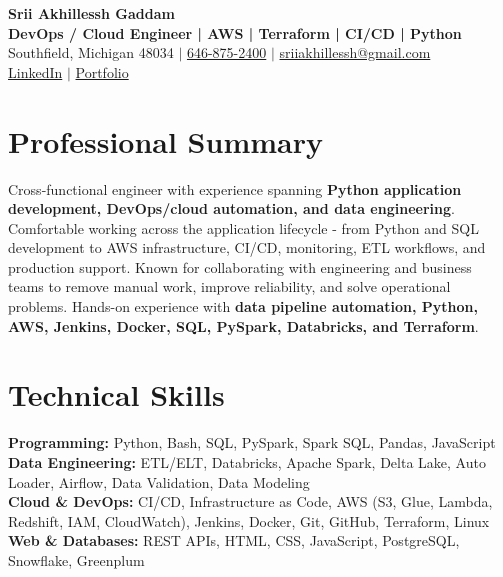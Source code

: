 \documentclass[letterpaper,10pt]{article}
\begin{document}
\fontsize{9.35pt}{10.45pt}\selectfont

\begin{center}
    {\LARGE \textbf{Srii Akhillessh Gaddam}} \\[-1pt]
    \textbf{DevOps / Cloud Engineer | AWS | Terraform | CI/CD | Python} \\[2pt]
    Southfield, Michigan 48034 $|$
    \href{tel:6468752400}{646-875-2400} $|$
    \href{mailto:sriiakhillessh@gmail.com}{sriiakhillessh@gmail.com} \\[1pt]
    \href{https://www.linkedin.com/in/srii-akhiilessh-gaddam-b48668191/}{LinkedIn} $|$
    \href{https://sriiakhillesshg.github.io/portfolio/}{Portfolio}
\end{center}
\vspace{-8pt}

\section{Professional Summary}
\small{Cross-functional engineer with experience spanning \textbf{Python application development, DevOps/cloud automation, and data engineering}. Comfortable working across the application lifecycle - from Python and SQL development to AWS infrastructure, CI/CD, monitoring, ETL workflows, and production support. Known for collaborating with engineering and business teams to remove manual work, improve reliability, and solve operational problems. Hands-on experience with \textbf{data pipeline automation, Python, AWS, Jenkins, Docker, SQL, PySpark, Databricks, and Terraform}.}

\section{Technical Skills}
\small{
\textbf{Programming:} Python, Bash, SQL, PySpark, Spark SQL, Pandas, JavaScript \\
\textbf{Data Engineering:} ETL/ELT, Databricks, Apache Spark, Delta Lake, Auto Loader, Airflow, Data Validation, Data Modeling \\
\textbf{Cloud \& DevOps:} CI/CD, Infrastructure as Code, AWS (S3, Glue, Lambda, Redshift, IAM, CloudWatch), Jenkins, Docker, Git, GitHub, Terraform, Linux \\
\textbf{Web \& Databases:} REST APIs, HTML, CSS, JavaScript, PostgreSQL, Snowflake, Greenplum
}
\end{document}
